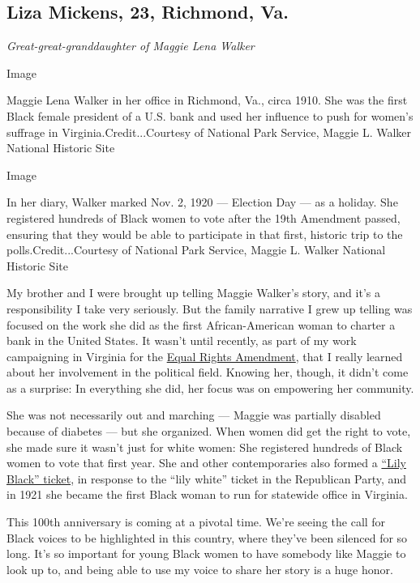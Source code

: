 \hypertarget{liza-mickens-23-richmond-va}{%
\subsection{Liza Mickens, 23, Richmond,
Va.}\label{liza-mickens-23-richmond-va}}

\emph{Great-great-granddaughter of Maggie Lena Walker}

Image

Maggie Lena Walker in her office in Richmond, Va., circa 1910. She was
the first Black female president of a U.S. bank and used her influence
to push for women's suffrage in Virginia.Credit...Courtesy of National
Park Service, Maggie L. Walker National Historic Site

Image

In her diary, Walker marked Nov. 2, 1920 --- Election Day --- as a
holiday. She registered hundreds of Black women to vote after the 19th
Amendment passed, ensuring that they would be able to participate in
that first, historic trip to the polls.Credit...Courtesy of National
Park Service, Maggie L. Walker National Historic Site

My brother and I were brought up telling Maggie Walker's story, and it's
a responsibility I take very seriously. But the family narrative I grew
up telling was focused on the work she did as the first African-American
woman to charter a bank in the United States. It wasn't until recently,
as part of my work campaigning in Virginia for the
\href{https://www.nytimes3xbfgragh.onion/2020/01/15/us/era-virginia-vote.html}{Equal
Rights Amendment}, that I really learned about her involvement in the
political field. Knowing her, though, it didn't come as a surprise: In
everything she did, her focus was on empowering her community.

She was not necessarily out and marching --- Maggie was partially
disabled because of diabetes --- but she organized. When women did get
the right to vote, she made sure it wasn't just for white women: She
registered hundreds of Black women to vote that first year. She and
other contemporaries also formed a
\href{https://digitalsc.lib.vt.edu/exhibits/show/womens-history-2016/item/4697}{``Lily
Black'' ticket}, in response to the ``lily white'' ticket in the
Republican Party, and in 1921 she became the first Black woman to run
for statewide office in Virginia.

This 100th anniversary is coming at a pivotal time. We're seeing the
call for Black voices to be highlighted in this country, where they've
been silenced for so long. It's so important for young Black women to
have somebody like Maggie to look up to, and being able to use my voice
to share her story is a huge honor.

